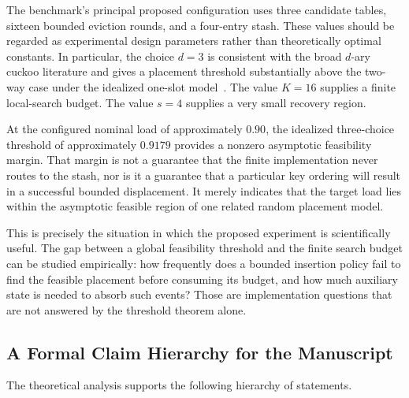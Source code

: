 \documentclass[conference]{IEEEtran}
\begin{document}
The benchmark's principal proposed configuration uses three candidate tables, sixteen bounded eviction rounds, and a four-entry stash. These values should be regarded as experimental design parameters rather than theoretically optimal constants. In particular, the choice $d=3$ is consistent with the broad $d$-ary cuckoo literature and gives a placement threshold substantially above the two-way case under the idealized one-slot model~\cite{fountoulakis2012sharp,dietzfelbinger2009tight}. The value $K=16$ supplies a finite local-search budget. The value $s=4$ supplies a very small recovery region.

At the configured nominal load of approximately $0.90$, the idealized three-choice threshold of approximately $0.9179$ provides a nonzero asymptotic feasibility margin. That margin is not a guarantee that the finite implementation never routes to the stash, nor is it a guarantee that a particular key ordering will result in a successful bounded displacement. It merely indicates that the target load lies within the asymptotic feasible region of one related random placement model.

This is precisely the situation in which the proposed experiment is scientifically useful. The gap between a global feasibility threshold and the finite search budget can be studied empirically: how frequently does a bounded insertion policy fail to find the feasible placement before consuming its budget, and how much auxiliary state is needed to absorb such events? Those are implementation questions that are not answered by the threshold theorem alone.

\subsection{A Formal Claim Hierarchy for the Manuscript}

The theoretical analysis supports the following hierarchy of statements.
\end{document}
